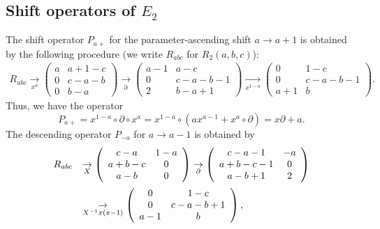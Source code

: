\documentclass[a4paper,12pt]{article}
\theoremstyle{definition}
\theoremstyle{remark}
\numberwithin{equation}{section} %
\begin{document}
\subsection{Shift operators of $E_2$}\label{E2Shift}
The shift operator $P_{a+}$ for the parameter-ascending shift $a\to a+1$ is 
obtained by the following procedure (we write $R_{abc}$ for $R_2(a,b,c)$):
\[ \begin{array}{l}     %
R_{abc}
\underset{x^a}{\to}
\left( \begin{array}{cc}
a&a+1-c\\
0&c-a-b\\
0&b-a\end{array}\right) 
\underset{\partial}{\to}
\left( \begin{array}{cc}
a-1&a-c\\
0&c-a-b-1\\
2&b-a+1\end{array}\right) %
 \underset{x^{1-a}}{\to}
\left( \begin{array}{cc}
0&1-c\\
0&c-a-b-1\\
a+1&b\end{array}\right).
\end{array} \]
Thus, we have the operator
$$P_{a+}=x^{1-a}\circ \partial\circ x^a =x^{1-a}\circ (ax^{a-1}+x^a\circ \partial)=x\partial+a.$$
The descending operator $P_{-a}$ for $a\to a-1$ is obtained by 
\[ \begin{array}{ll}
  R_{abc}  &
\underset{X}{\to}
\left( \begin{array}{cc}
c-a&1-a\\
a+b-c&0\\
a-b&0\end{array}\right)\underset{\partial}{\to}
\left( \begin{array}{cc}
c-a-1&-a\\
a+b-c-1&0\\
a-b+1&2\end{array}\right)\\ \noalign{\medskip}&
\underset{X^{-1}x(x-1)}{\to}
\left( \begin{array}{cc}
0&1-c\\
0&c-a-b+1\\
a-1&b\end{array}\right),
\end{array} \]
\end{document}
